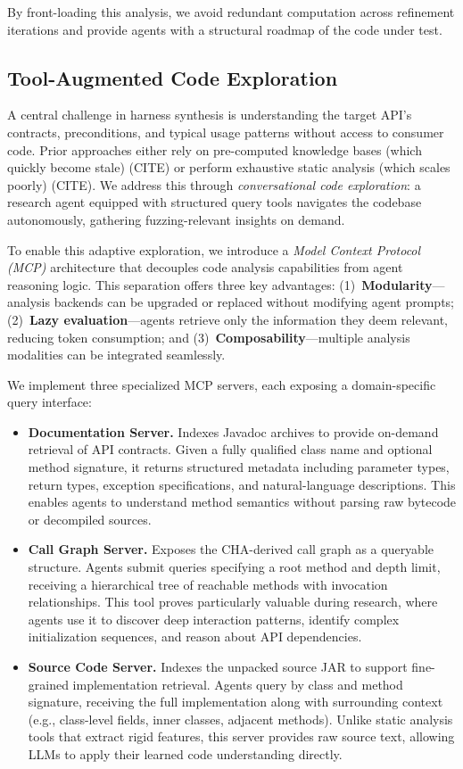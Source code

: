 \documentclass[sigconf,review,anonymous]{acmart}
\begin{document}
By front-loading this analysis, we avoid redundant computation across refinement iterations and provide agents with a structural roadmap of the code under test.

\subsection{Tool-Augmented Code Exploration}

A central challenge in harness synthesis is understanding the target API's contracts, preconditions, and typical usage patterns without access to consumer code. Prior approaches either rely on pre-computed knowledge bases (which quickly become stale) (CITE) or perform exhaustive static analysis (which scales poorly) (CITE). We address this through \emph{conversational code exploration}: a research agent equipped with structured query tools navigates the codebase autonomously, gathering fuzzing-relevant insights on demand.

To enable this adaptive exploration, we introduce a \emph{Model Context Protocol (MCP)} architecture that decouples code analysis capabilities from agent reasoning logic. This separation offers three key advantages: (1)~\textbf{Modularity}—analysis backends can be upgraded or replaced without modifying agent prompts; (2)~\textbf{Lazy evaluation}—agents retrieve only the information they deem relevant, reducing token consumption; and (3)~\textbf{Composability}—multiple analysis modalities can be integrated seamlessly.

We implement three specialized MCP servers, each exposing a domain-specific query interface:

\begin{itemize}
    \item \textbf{Documentation Server.} Indexes Javadoc archives to provide on-demand retrieval of API contracts. Given a fully qualified class name and optional method signature, it returns structured metadata including parameter types, return types, exception specifications, and natural-language descriptions. This enables agents to understand method semantics without parsing raw bytecode or decompiled sources.

    \item \textbf{Call Graph Server.} Exposes the CHA-derived call graph as a queryable structure. Agents submit queries specifying a root method and depth limit, receiving a hierarchical tree of reachable methods with invocation relationships. This tool proves particularly valuable during research, where agents use it to discover deep interaction patterns, identify complex initialization sequences, and reason about API dependencies.

    \item \textbf{Source Code Server.} Indexes the unpacked source JAR to support fine-grained implementation retrieval. Agents query by class and method signature, receiving the full implementation along with surrounding context (e.g., class-level fields, inner classes, adjacent methods). Unlike static analysis tools that extract rigid features, this server provides raw source text, allowing LLMs to apply their learned code understanding directly.
\end{itemize}
\end{document}
